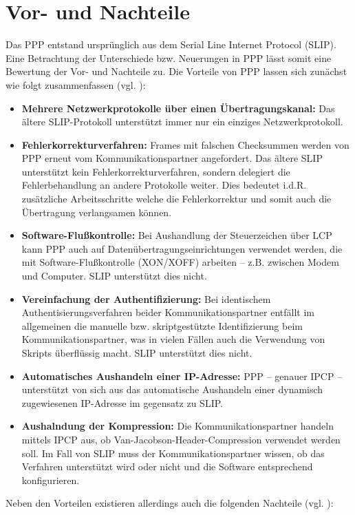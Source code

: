 \documentclass[journal,11pt]{IEEEtran}
\begin{document}
\section{Vor- und Nachteile} 
%
Das PPP entstand ursprünglich aus dem Serial Line Internet Protocol (SLIP).
Eine Betrachtung der Unterschiede bzw. Neuerungen in PPP lässt somit eine
Bewertung der Vor- und Nachteile zu. Die Vorteile
von PPP lassen sich zunächst wie folgt zusammenfassen (vgl. \cite{ppp_slip_uniwi}):
%
\begin{itemize}
\item \textbf{Mehrere Netzwerkprotokolle über einen Übertragungskanal:} Das ältere SLIP-Protokoll unterstützt immer nur ein einziges Netzwerkprotokoll.
\item \textbf{Fehlerkorrekturverfahren:} Frames mit falschen Checksummen werden von PPP erneut vom Kommunikationspartner angefordert. Das ältere
	SLIP unterstützt kein Fehlerkorrekturverfahren, sondern delegiert die Fehlerbehandlung an andere Protokolle weiter. Dies bedeutet i.d.R. zusätzliche
	Arbeitsschritte welche die Fehlerkorrektur und somit auch die Übertragung verlangsamen können.
\item \textbf{Software-Flußkontrolle:} Bei Aushandlung der Steuerzeichen über LCP kann PPP auch auf Datenübertragungseinrichtungen verwendet werden, die mit Software-Flußkontrolle (XON/XOFF) arbeiten -- z.B. zwischen Modem und Computer. SLIP unterstützt dies nicht.
\item \textbf{Vereinfachung der Authentifizierung:} Bei identischem Authentisierungsverfahren beider Kommunikationspartner entfällt im allgemeinen die manuelle bzw. skriptgestützte Identifizierung beim Kommunikationspartner, was in vielen Fällen auch die Verwendung von Skripts überflüssig macht. SLIP unterstützt dies nicht.
\item \textbf{Automatisches Aushandeln einer IP-Adresse:} PPP -- genauer IPCP -- unterstützt von sich aus das automatische Aushandeln einer dynamisch zugewiesenen IP-Adresse im gegensatz zu SLIP.
\item \textbf{Aushalndung der Kompression:} Die Kommunikationspartner handeln mittels IPCP aus, ob Van-Jacobson-Header-Compression verwendet werden soll. Im Fall von SLIP muss der Kommunikationspartner wissen, ob das Verfahren unterstützt wird oder nicht und die Software entsprechend konfigurieren.
\end{itemize}
%
Neben den Vorteilen existieren allerdings auch die folgenden Nachteile (vgl. \cite{ppp_slip_uniwi}):
%
\end{document}
